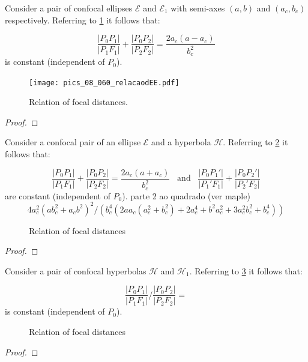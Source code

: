\begin{proposition}
	Consider a pair of confocal ellipses $\mathcal{E}$ and $\mathcal{E}_1$ with semi-axes $(a,b)$ and $(a_c,b_c)$ respectively. Referring to   \cref{fig:dEE1} it follows that:
	
	\[\frac{|P_0P_1|}{|P_1F_1|}+\frac{|P_0P_2|}{|P_2F_2|}=\frac{2 a_c (a-a_c)}{b_c^2}\]
	is constant (independent of $P_0$).
\label{prop:dEE1}	
\end{proposition}
\begin{figure}[h]
	\begin{center}	 
  \texttt{[image: pics\_08\_060\_relacaodEE.pdf]}
		\caption { Relation of focal distances. \label{fig:dEE1} }
	\end{center}
	
\end{figure}
\begin{proof}

\end{proof}

\begin{proposition}
	Consider a confocal pair of an ellipse  $\mathcal{E}$ and a hyperbola $\mathcal{H}$. Referring to   \cref{fig:dEH} it follows that:
	
	\[\frac{|P_0P_1|}{|P_1F_1|}+\frac{|P_0P_2|}{|P_2F_2|}=\frac{2a_c(a+a_c)}{b_c^2}\;\;\; \text{and}\;\;\; \frac{|P_0P_1'|}{|P_1'F_1|}+\frac{|P_0P_2'|}{|P_2'F_2|}\]
	are constant (independent of $P_0$).
	parte 2 ao quadrado (ver maple)
	\[4a_c^2(a b_c^2+a_c b^2)^2/(b_c^4(2a a_c(a_c^2+b_c^2)+2a_c^4+b^2 a_c^2+3 a_c^2 b_c^2+b_c^4))\]
\end{proposition}
\begin{figure}[H]
	\begin{center}
		\def\svgwidth{0.55\textwidth}
		
		\caption { Relation of focal distances   }
		\label{fig:dEH}
	\end{center}
\end{figure}
\begin{proof}

\end{proof}
\begin{proposition}
	Consider a pair of confocal hyperbolas $\mathcal{H}$ and $\mathcal{H}_1$. Referring to   \cref{fig:dHH} it follows that:
	
	\[\frac{|P_0P_1|}{|P_1F_1|}/\frac{|P_0P_2|}{|P_2F_2|}=\]
	is constant (independent of $P_0$).
	
\end{proposition}
\begin{figure}[H]
	\begin{center}
		\def\svgwidth{0.75\textwidth}
		
		\caption { Relation of focal distances  }
		\label{fig:dHH}
	\end{center}
\end{figure}
\begin{proof}


\end{proof}


